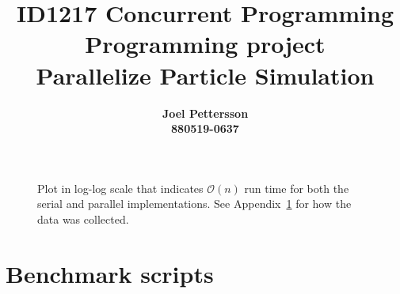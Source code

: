 \documentclass[12pt,a4paper]{article}
\title{
    {\normalsize\sc ID1217 Concurrent Programming} \\ 
    {\large Programming project} \\
    Parallelize Particle Simulation
}
\author{
    \bf Joel Pettersson \\
    \bf 880519-0637 \\
}
\begin{document}
\maketitle

\begin{figure}
    \begin{center}
        
        \caption{Plot in log-log scale that indicates $\mathcal{O}(n)$ run time for
        both the serial and parallel implementations. See
        Appendix~\ref{sec:appendixBenchmarkScripts} for how the data was collected.} 
    \end{center}
\end{figure}



\appendix

\section{Benchmark scripts}
\label{sec:appendixBenchmarkScripts}


\end{document}
